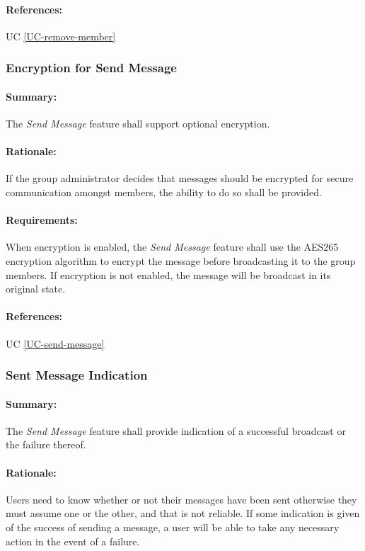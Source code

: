 \documentclass[11pt]{article}
\begin{document}
\paragraph{References:} UC \ref{UC-remove-member}

\subsubsection{Encryption for Send Message} \label{FR-send-message-encrypted}
\paragraph{Summary:} The \textit{Send Message} feature shall support optional encryption.
\paragraph{Rationale:} If the group administrator decides that messages should be encrypted for secure communication amongst members, the ability to do so shall be provided.
\paragraph{Requirements:} When encryption is enabled, the \textit{Send Message} feature shall use the AES265 encryption algorithm to encrypt the message before broadcasting it to the group members. If encryption is not enabled, the message will be broadcast in its original state.
\paragraph{References:} UC \ref{UC-send-message}

\subsubsection{Sent Message Indication} \label{FR-send-message-indicator}
\paragraph{Summary:} The \textit{Send Message} feature shall provide indication of a successful broadcast or the failure thereof.
\paragraph{Rationale:} Users need to know whether or not their messages have been sent otherwise they must assume one or the other, and that is not reliable. If some indication is given of the success of sending a message, a user will be able to take any necessary action in the event of a failure.
\end{document}
